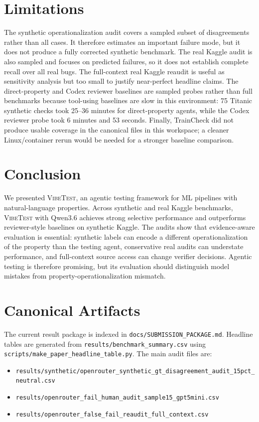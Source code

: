 \documentclass[11pt]{article}
\newcommand{\vibetest}{\textsc{VibeTest}}
\newcommand{\qwen}{Qwen3.6}
\begin{document}
\section{Limitations}

The synthetic operationalization audit covers a sampled subset of disagreements rather than all cases.
It therefore estimates an important failure mode, but it does not produce a fully corrected synthetic benchmark.
The real Kaggle audit is also sampled and focuses on predicted failures, so it does not establish complete recall over all real bugs.
The full-context real Kaggle reaudit is useful as sensitivity analysis but too small to justify near-perfect headline claims.
The direct-property and Codex reviewer baselines are sampled probes rather than full benchmarks because tool-using baselines are slow in this environment: 75 Titanic synthetic checks took 25--36 minutes for direct-property agents, while the Codex reviewer probe took 6 minutes and 53 seconds.
Finally, TrainCheck did not produce usable coverage in the canonical files in this workspace; a cleaner Linux/container rerun would be needed for a stronger baseline comparison.

\section{Conclusion}

We presented \vibetest, an agentic testing framework for ML pipelines with natural-language properties.
Across synthetic and real Kaggle benchmarks, \vibetest{} with \qwen{} achieves strong selective performance and outperforms reviewer-style baselines on synthetic Kaggle.
The audits show that evidence-aware evaluation is essential: synthetic labels can encode a different operationalization of the property than the testing agent, conservative real audits can understate performance, and full-context source access can change verifier decisions.
Agentic testing is therefore promising, but its evaluation should distinguish model mistakes from property-operationalization mismatch.



\appendix

\section{Canonical Artifacts}

The current result package is indexed in \texttt{docs/SUBMISSION\_PACKAGE.md}.
Headline tables are generated from \texttt{results/benchmark\_summary.csv} using \texttt{scripts/make\_paper\_headline\_table.py}.
The main audit files are:
\begin{itemize}
  \item \texttt{results/synthetic/openrouter\_synthetic\_gt\_disagreement\_audit\_15pct\_neutral.csv}
  \item \texttt{results/openrouter\_fail\_human\_audit\_sample15\_gpt5mini.csv}
  \item \texttt{results/openrouter\_false\_fail\_reaudit\_full\_context.csv}
\end{itemize}
\end{document}
